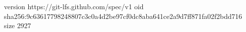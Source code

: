 version https://git-lfs.github.com/spec/v1
oid sha256:9c63617798248807c3c0a4d2be97cf0dc8aba641ce2a9d7ff871fa02f2bdd716
size 2927
